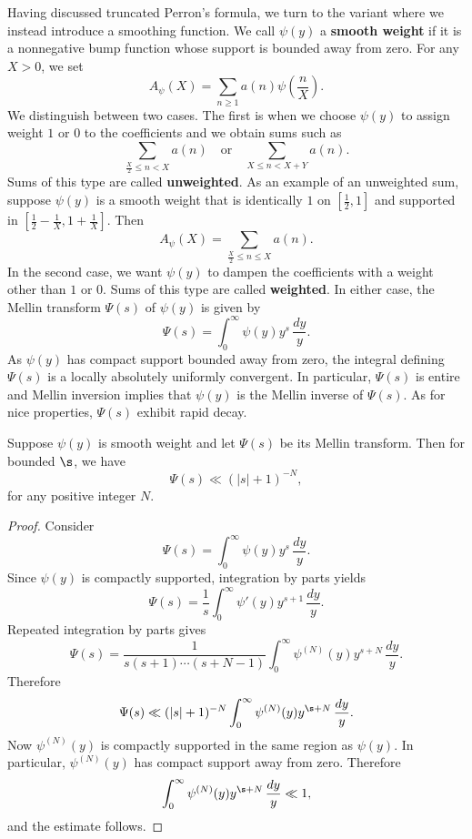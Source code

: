 \documentclass[12pt]{article}
\begin{document}
      Having discussed truncated Perron's formula, we turn to the variant where we instead introduce a smoothing function. We call \(\psi(y)\) a \textbf{smooth weight} if it is a nonnegative bump function whose support is bounded away from zero. For any \(X > 0\), we set
      \[
        A_{\psi}(X) = \sum_{n \ge 1}a(n)\psi\left(\frac{n}{X}\right).
      \]
      We distinguish between two cases. The first is when we choose \(\psi(y)\) to assign weight \(1\) or \(0\) to the coefficients and we obtain sums such as
      \[
        \sum_{\frac{X}{2} \le n < X}a(n) \quad \text{or} \quad \sum_{X \le n < X+Y}a(n).
      \]
      Sums of this type are called \textbf{unweighted}. As an example of an unweighted sum, suppose \(\psi(y)\) is a smooth weight that is identically \(1\) on \(\left[\frac{1}{2},1\right]\) and supported in \(\left[\frac{1}{2}-\frac{1}{X},1+\frac{1}{X}\right]\). Then
      \[
        A_{\psi}(X) = \sum_{\frac{X}{2} \le n \le X}a(n).
      \]
      In the second case, we want \(\psi(y)\) to dampen the coefficients with a weight other than \(1\) or \(0\). Sums of this type are called \textbf{weighted}. In either case, the Mellin transform \(\Psi(s)\) of \(\psi(y)\) is given by
      \[
        \Psi(s) = \int_{0}^{\infty}\psi(y)y^{s}\,\frac{dy}{y}.
      \]
      As \(\psi(y)\) has compact support bounded away from zero, the integral defining \(\Psi(s)\) is a locally absolutely uniformly convergent. In particular, \(\Psi(s)\) is entire and Mellin inversion implies that \(\psi(y)\) is the Mellin inverse of \(\Psi(s)\). As for nice properties, \(\Psi(s)\) exhibit rapid decay.

      \begin{proposition}\label{prop:smoothing_function_Mellin_inverse_vertical_strips}
        Suppose \(\psi(y)\) is smooth weight and let \(\Psi(s)\) be its Mellin transform. Then for bounded \(\s\), we have
        \[
          \Psi(s) \ll (|s|+1)^{-N},
        \]
        for any positive integer \(N\).
      \end{proposition}
      \begin{proof}
        Consider
        \[
          \Psi(s) = \int_{0}^{\infty}\psi(y)y^{s}\,\frac{dy}{y}.
        \]
        Since \(\psi(y)\) is compactly supported, integration by parts yields
        \[
          \Psi(s) = \frac{1}{s}\int_{0}^{\infty}\psi'(y)y^{s+1}\,\frac{dy}{y}.
        \]
        Repeated integration by parts gives
        \[
          \Psi(s) = \frac{1}{s(s+1) \cdots (s+N-1)}\int_{0}^{\infty}\psi^{(N)}(y)y^{s+N}\,\frac{dy}{y}.
        \]
        Therefore
        \[
          \Psi(s) \ll (|s|+1)^{-N}\int_{0}^{\infty}\psi^{(N)}(y)y^{\s+N}\,\frac{dy}{y}.
        \]
        Now \(\psi^{(N)}(y)\) is compactly supported in the same region as \(\psi(y)\). In particular, \(\psi^{(N)}(y)\) has compact support away from zero. Therefore
        \[
          \int_{0}^{\infty}\psi^{(N)}(y)y^{\s+N}\,\frac{dy}{y} \ll 1,
        \]
        and the estimate follows.
      \end{proof}
      
\end{document}
